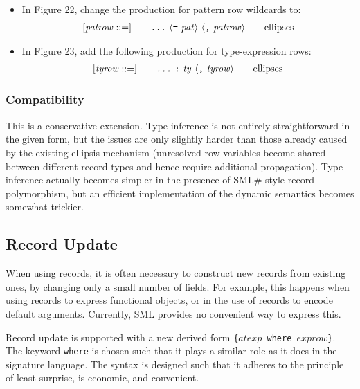 \documentclass[twoside,titlepage]{article}
\begin{document}
\begin{appendix}
\begin{itemize}
\item In Figure 22, change the production for pattern row wildcards to: 
  $$
  \begin{array}{l@{\qquad}l@{\qquad}l}
   [\mathit{patrow} ::=] & \mbox{\tt...}~\langle\mbox{\tt=}~\mathit{pat}\rangle~\langle\mbox{\tt,}~\mathit{patrow}\rangle & \textrm{ellipses}
  \end{array}
  $$

\item In Figure 23, add the following production for type-expression rows: 
  $$
  \begin{array}{l@{\qquad}l@{\qquad}l}
   [\mathit{tyrow} ::=] & \mbox{\tt...}~\mbox{\tt:}~\mathit{ty}~\langle\mbox{\tt,}~\mathit{tyrow}\rangle & \textrm{ellipses}
  \end{array}
  $$
\end{itemize}


\subsubsection*{Compatibility}

This is a conservative extension. Type inference is not entirely straightforward in the given form, but the issues are only slightly harder than those already caused by the existing ellipsis mechanism (unresolved row variables become shared between different record types and hence require additional propagation). Type inference actually becomes simpler in the presence of SML\#-style record polymorphism, but an efficient implementation of the dynamic semantics becomes somewhat trickier.


\subsection{Record Update}
\label{ext-recordupdate}

When using records, it is often necessary to construct new records from existing ones, by changing only a small number of fields. For example, this happens when using records to express functional objects, or in the use of records to encode default arguments. Currently, SML provides no convenient way to express this.

Record update is supported with a new derived form
{\tt\{$\mathit{atexp}$ where $\mathit{exprow}$\}}. The keyword {\tt where} is chosen such that it plays a similar role as it does in the signature language.
The syntax is designed such that it adheres to the principle of least surprise, is economic, and convenient.


\end{appendix}
\end{document}
